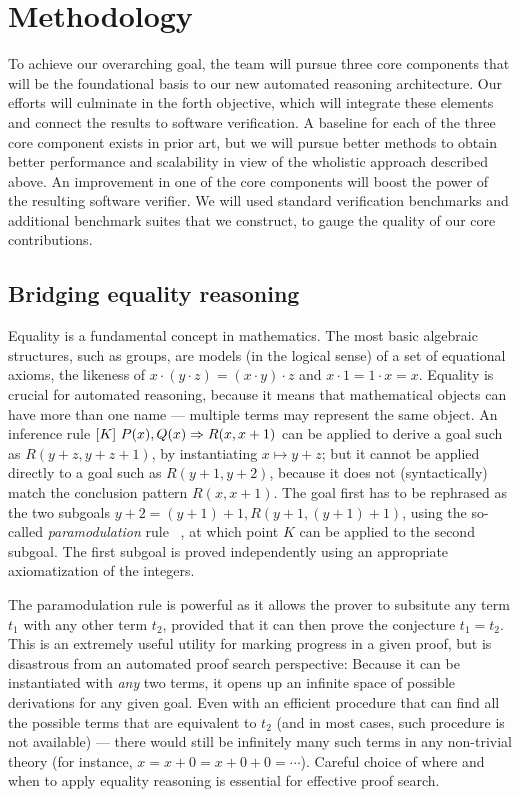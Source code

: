 \section{Methodology}
\label{b2:methodology}

To achieve our overarching goal, the team will pursue three core components that will be the foundational basis to our new automated reasoning architecture.
Our efforts will culminate in the forth objective, which will integrate these elements and connect the results to software verification.
A baseline for each of the three core component exists in prior art, but we will pursue better methods to obtain better performance and scalability in view of the wholistic approach described above.
An improvement in one of the core components will boost the power of the resulting software verifier.
We will used standard verification benchmarks and additional benchmark suites that we construct, to gauge the quality of our core contributions.


\subsection{Bridging equality reasoning}

Equality is a fundamental concept in mathematics.
The most basic algebraic structures, such as groups,
are models (in the logical sense) of a set of equational
axioms, the likeness of $x\cdot(y\cdot z) = (x\cdot y)\cdot z$ and $x\cdot 1 = 1\cdot x = x$.
Equality is crucial for automated reasoning, because it means that mathematical objects can have more than one name --- multiple terms may represent the same object.
An inference rule $[K]~{P(x),Q(x)} \Rightarrow {R(x, x+1)}$
can be applied to derive a goal such as $R(y+z, y+z+1)$,
by instantiating $x\mapsto y+z$;
but it cannot be applied directly to a goal such as
$R(y+1, y+2)$, because it does not (syntactically) match the conclusion pattern $R(x,x+1)$.
The goal first has to be rephrased as the two subgoals
$y + 2 = (y + 1) + 1, R(y+1, (y+1)+1)$, using the so-called \emph{paramodulation} rule%
~\cite{Book2001:Nieuwenhuis},
at which point $K$ can be applied to the second subgoal.
The first subgoal is proved independently using an appropriate axiomatization of the integers.

The paramodulation rule is powerful as it allows the prover to subsitute any term $t_1$ with any other term $t_2$, provided that it can then prove the conjecture $t_1 = t_2$.
This is an extremely useful utility for marking progress in a given proof, but is disastrous from an automated proof search perspective:
Because it can be instantiated with \emph{any} two terms, it opens up an infinite space of possible derivations for any given goal.
Even with an efficient procedure that can find all the possible terms that are equivalent to $t_2$ (and in most cases, such procedure is not available) ---
there would still be infinitely many such terms in any non-trivial theory (for instance, $x = x + 0 = x + 0 + 0 = \cdots$).
Careful choice of where and when to apply equality reasoning is essential for effective proof search.

